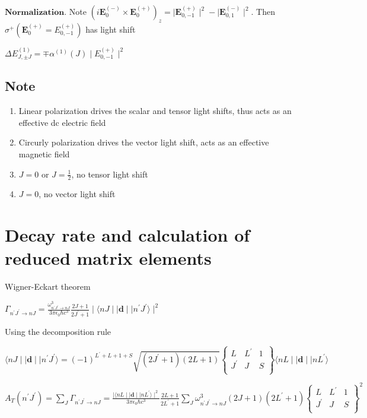 \documentclass{article}
\begin{document}
$\textbf{Normalization.}$ Note
$(i \textbf{E}_0^{(-)} \times \textbf{E}_0^{(+)})_z = \mid \textbf{E}_{0, -1}^{(+)}\mid^2 - \mid \textbf{E}_{0, 1}^{(-)}\mid^2$.
Then $\sigma^{+} (\textbf{E}_0^{(+)} = E^{(+)}_{0, -1})$ has light shift

$\Delta E_{J, \pm{J}} ^{(1)} = \mp \alpha^{(1)}(J) \mid E_{0, -1}^{(+)}\mid^2$

    \subsection{Note}\label{note}

    \begin{enumerate}
\def\labelenumi{\arabic{enumi}.}
\item
  Linear polarization drives the scalar and tensor light shifts, thus
  acts as an effective dc electric field
\item
  Circurly polarization drives the vector light shift, acts as an
  effective magnetic field
\item
  $J = 0$ or $J = \frac{1}{2}$, no tensor light shift
\item
  $J = 0$, no vector light shift
\end{enumerate}

    \section{Decay rate and calculation of reduced matrix
elements}\label{decay-rate-and-calculation-of-reduced-matrix-elements}

    Wigner-Eckart theorem

$\Gamma_{n^{'} J^{'} \rightarrow nJ} = \frac{\omega_{n^{'} J^{'} \rightarrow nJ}^3}{3 \pi \epsilon_0 \hbar c^3} \frac{2 J + 1}{2 J^{'} + 1} \mid \langle nJ \mid \mid \textbf{d} \mid \mid n^{'} J^{'} \rangle \mid^2$

Using the decomposition rule

$\langle nJ \mid \mid \textbf{d} \mid \mid n^{'}J^{'} \rangle  = (-1)^{L^{'} + L + 1 + S} \sqrt{(2J^{'} + 1)(2 L + 1)}  \begin{Bmatrix} L & L^{'} & 1 \\ J^{'} &  J & S \\ \end{Bmatrix} \langle nL \mid \mid \textbf{d} \mid \mid nL^{'} \rangle $

$A_T(n^{'}J^{'}) = \sum_{J} \Gamma_{n^{'} J^{'} \rightarrow nJ} = \frac{\mid \langle nL \mid \mid \textbf{d} \mid \mid nL^{'} \rangle \mid^2}{3 \pi \epsilon_0 \hbar c^3} \frac{2L+1}{2L^{'}+1} \sum_J \omega_{n^{'} J^{'} \rightarrow nJ}^3 (2J+1)(2L^{'}+1) \begin{Bmatrix} L & L^{'} & 1 \\ J^{'} &  J & S \\ \end{Bmatrix}^2$
\end{document}
